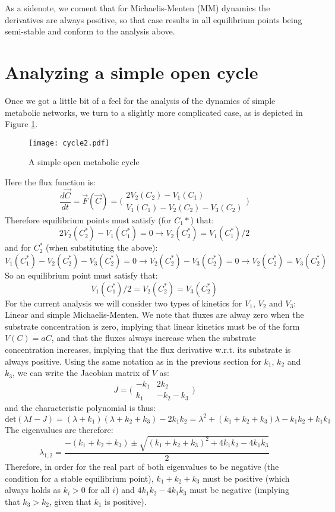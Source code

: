 \documentclass[a4page,notitlepage]{article}
\begin{document}
As a sidenote, we coment that for Michaelis-Menten (MM) dynamics the derivatives are always positive, so that case results in all equilibrium points being semi-stable and conform to the analysis above.
\section{Analyzing a simple open cycle}
Once we got a little bit of a feel for the analysis of the dynamics of simple metabolic networks, we turn to a slightly more complicated case, as is depicted in Figure \ref{open-cycle}.
\begin{figure}[h]
\centering
\texttt{[image: cycle2.pdf]}
\caption{A simple open metabolic cycle}
\label{open-cycle}
\end{figure}
Here the flux function is:
\[
\frac{d\vec{C}}{dt}=\vec{F}(\vec{C})=
\bigg(
\begin{matrix}
2V_2(C_2)-V_1(C_1) \\
V_1(C_1)-V_2(C_2)-V_3(C_2)
\end{matrix}
\bigg)
\]
Therefore equilibrium points must satisfy (for $C_1*$) that:
\[
2V_2(C_2^*)-V_1(C_1^*)=0 \rightarrow V_2(C_2^*)=V_1(C_1^*)/2
\]
and for $C_2^*$ (when substituting the above):
\[
V_1(C_1^*)-V_2(C_2^*)-V_3(C_2^*)=0 \rightarrow V_2(C_2^*)-V_3(C_2^*)=0 \rightarrow V_2(C_2^*)=V_3(C_2^*)
\]
So an equilibrium point must satisfy that:
\[ V_1(C_1^*)/2=V_2(C_2^*)=V_3(C_2^*) \]
For the current analysis we will consider two types of kinetics for $V_1$, $V_2$ and $V_3$: Linear and simple Michaelis-Menten.
We note that fluxes are alway zero when the substrate concentration is zero, implying that linear kinetics must be of the form $V(C)=aC$, and that the fluxes always increase when the substrate concentration increases, implying that the flux derivative w.r.t. its substrate is always positive.
Using the same notation as in the previous section for $k_1$, $k_2$ and $k_3$, we can write the Jacobian matrix of $V$ as:
\[
J=\bigg(
\begin{matrix}
    -k_1 & 2k_2 \\
    k_1 & -k_2-k_3
\end{matrix}
\bigg)
\]
and the characteristic polynomial is thus:
\[
\text{det}(\lambda I -J)=(\lambda+k_1)(\lambda+k_2+k_3)-2k_1k_2=\lambda^2+(k_1+k_2+k_3)\lambda -k_1k_2+k_1k_3
\]
The eigenvalues are therefore:
\[
\lambda_{1,2}=\frac{-(k_1+k_2+k_3)\pm \sqrt{(k_1+k_2+k_3)^2+4k_1k_2-4k_1k_3}}{2}
\]
Therefore, in order for the real part of both eigenvalues to be negative (the condition for a stable equilibrium point), $k_1+k_2+k_3$ must be positive (which always holds as $k_i>0$ for all $i$) and $4k_1k_2-4k_1k_3$ must be negative (implying that $k_3>k_2$, given that $k_1$ is positive).
\end{document}

